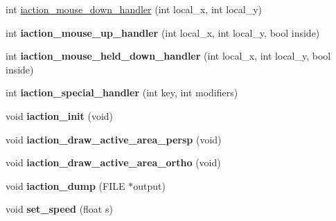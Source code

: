 \begin{DoxyCompactItemize}
\item 
int \hyperlink{class_g_l_u_i___translation_a92ca690a16b858d761aa9e12ac44ec13}{iaction\+\_\+mouse\+\_\+down\+\_\+handler} (int local\+\_\+x, int local\+\_\+y)
\item 
\hypertarget{class_g_l_u_i___translation_a7674b5641e87b9d73a590a9cbfd83783}{int {\bfseries iaction\+\_\+mouse\+\_\+up\+\_\+handler} (int local\+\_\+x, int local\+\_\+y, bool inside)}\label{class_g_l_u_i___translation_a7674b5641e87b9d73a590a9cbfd83783}

\item 
\hypertarget{class_g_l_u_i___translation_a2d13c80e8d6d16378a2f0ceecda7a3c4}{int {\bfseries iaction\+\_\+mouse\+\_\+held\+\_\+down\+\_\+handler} (int local\+\_\+x, int local\+\_\+y, bool inside)}\label{class_g_l_u_i___translation_a2d13c80e8d6d16378a2f0ceecda7a3c4}

\item 
\hypertarget{class_g_l_u_i___translation_a4bdc9a327c975a24546e2733f5f5cb01}{int {\bfseries iaction\+\_\+special\+\_\+handler} (int key, int modifiers)}\label{class_g_l_u_i___translation_a4bdc9a327c975a24546e2733f5f5cb01}

\item 
\hypertarget{class_g_l_u_i___translation_abacc8d8aa4e4a99ab8c6965256ab2bb0}{void {\bfseries iaction\+\_\+init} (void)}\label{class_g_l_u_i___translation_abacc8d8aa4e4a99ab8c6965256ab2bb0}

\item 
\hypertarget{class_g_l_u_i___translation_affbd229a3bb1b680fccfd394a8277440}{void {\bfseries iaction\+\_\+draw\+\_\+active\+\_\+area\+\_\+persp} (void)}\label{class_g_l_u_i___translation_affbd229a3bb1b680fccfd394a8277440}

\item 
\hypertarget{class_g_l_u_i___translation_a78821a339feee6944df3dacbcd7867eb}{void {\bfseries iaction\+\_\+draw\+\_\+active\+\_\+area\+\_\+ortho} (void)}\label{class_g_l_u_i___translation_a78821a339feee6944df3dacbcd7867eb}

\item 
\hypertarget{class_g_l_u_i___translation_ab63de002536cd569083b07006fb3d430}{void {\bfseries iaction\+\_\+dump} (F\+I\+L\+E $\ast$output)}\label{class_g_l_u_i___translation_ab63de002536cd569083b07006fb3d430}

\item 
\hypertarget{class_g_l_u_i___translation_ad05a9584781a60bbbba6a9646dd43f1b}{void {\bfseries set\+\_\+speed} (float s)}\label{class_g_l_u_i___translation_ad05a9584781a60bbbba6a9646dd43f1b}


\end{DoxyCompactItemize}

